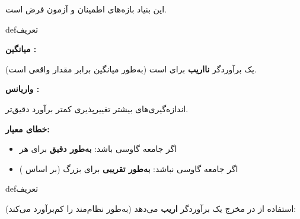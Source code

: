 این بنیاد بازه‌های اطمینان و آزمون فرض است.


\begin{PSbox}[unbreakable]{def}{تعریف}


\end{PSbox}


\textbf{میانگین :}

 یک برآوردگر \textbf{نااریب} برای \lr{$\mu$} است (به‌طور میانگین برابر مقدار واقعی است).

\textbf{واریانس :}

اندازه‌گیری‌های بیشتر \lr{\mbox{\ensuremath{\to}}} تغییرپذیری کمتر \lr{\mbox{\ensuremath{\to}}} برآورد دقیق‌تر.

\textbf{خطای معیار:}


\begin{itemize}
\tightlist
\item
  اگر جامعه گاوسی باشد:  \textbf{به‌طور دقیق} برای هر 
\item
  اگر جامعه گاوسی نباشد:  \textbf{به‌طور تقریبی} برای  بزرگ (بر اساس )
\end{itemize}


\begin{PSbox}[unbreakable]{def}{تعریف}


\end{PSbox}


استفاده از  در مخرج یک برآوردگر \textbf{اریب} می‌دهد (به‌طور نظام‌مند  را کم‌برآورد می‌کند):


